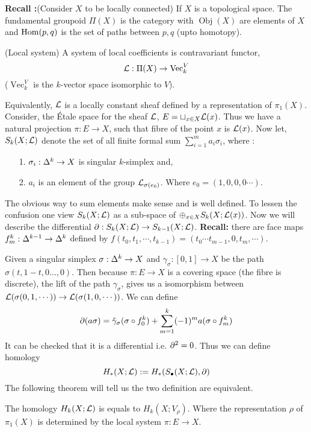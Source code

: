 \documentclass[11pt]{article}
\begin{document}
\textbf{Recall :}(Consider $X$ to be locally connected) If $X$ is a topological space. The fundamental groupoid $\Pi(X)$ is the category with $\operatorname{Obj}(X)$ are elements of $X$ and $\operatorname{Hom}(p,q)$ is the set of paths between $p,q$ (upto homotopy).
\begin{Def}{(Local system) }{}
   A system of local coefficients is contravariant functor, $$\mathcal{L} : \Pi(X) \to \operatorname{Vec}_k^{V}$$
   ($\operatorname{Vec}_k^{V}$ is the $k$-vector space isomorphic to $V$).
\end{Def}
\noindent Equivalently, $\mathcal{L}$ is a locally constant sheaf defined by a representation of $\pi_1(X)$. Consider, the \'Etale space for the sheaf $\mathcal{L}$, $E = \sqcup_{x \in X} \mathcal{L}(x)$. Thus we have a natural projection $\pi : E \to X$, such that fibre of the point $x$ is $\mathcal{L} (x)$. Now let, $S_k(X;\mathcal{L})$ denote the set of all finite formal sum $\sum_{i=1}^m a_i \sigma_i$, where : \begin{itemize}
    \item[1.] $\sigma_i: \Delta^k \to X$ is singular $k$-simplex and,
    \item[2.] $a_i$ is an element of the group $\mathcal{L}_{\sigma(e_0)}$. Where $e_0 =(1,0,0,0\cdots)$. 
\end{itemize} 
The obvious way to sum elements make sense and is well defined. To lessen the confusion one view $S_k(X;\mathcal{L})$ as a sub-space of $\oplus_{x\in X} S_k(X;\mathcal{L}(x))$. Now we will describe the differential $\partial : S_k(X;\mathcal{L}) \to S_{k-1}(X;\mathcal{L})$. \textbf{Recall:} there are face maps $f^k_m:\Delta^{k-1}\to \Delta^k$ defined by $f(t_0,t_1,\cdots,t_{k-1}) = (t_0 \cdots t_{m-1}, 0, t_m ,\cdots)$.

\vspace*{0.2cm}

Given a singular simplex $\sigma : \Delta^k \to X$ and $\gamma_{\sigma}:[0,1]\to X$ be the path $\sigma(t,1-t,0\dots,0)$. Then because $\pi : E \to X$ is a covering space (the fibre is discrete), the lift of the path $\gamma_{\sigma}$, gives us a isomorphism between $\mathcal{L}(\sigma(0,1,\cdots))\to \mathcal{L}(\sigma(1,0,\cdots))$. We can define $$\partial(a\sigma) = \tilde{\gamma}_{\sigma}(\sigma \circ f_0^{k}) + \sum_{m=1}^{k} (-1)^m a (\sigma \circ f_m^k)$$ It can be checked that it is a differential i.e. $\partial ^2 =0$. Thus we can define homology $$H_{\ast}(X;\mathcal{L}) := H_{\ast}(S_{\bullet}(X;\mathcal{L}),\partial)$$ The following theorem will tell us the two definition are equivalent. 

\begin{Thm}{}{}
  The homology $H_k(X;\mathcal{L})$ is equals to $H_k(X;V_{\rho})$. Where the representation $\rho$ of $\pi_1(X)$ is determined by the local system $\pi:E\to X$.
\end{Thm}
\end{document}
